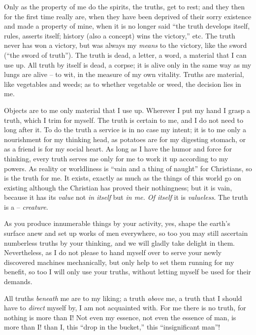 Only as the property of me do the spirits, the truths, get to rest; and they 
then for the first time really are, when they have been deprived of their 
sorry existence and made a property of mine, when it is no longer said ``the 
truth develops itself, rules, asserts itself; history (also a concept) wins 
the victory,'' etc. The truth never has won a victory, but was always my 
\textit{means} to the victory, like the sword (``the sword of truth''). The 
truth is dead, a letter, a word, a material that I can use up. All truth by 
itself is dead, a corpse; it is alive only in the same way as my lungs are 
alive -- to wit, in the measure of my own vitality. Truths are material, like 
vegetables and weeds; as to whether vegetable or weed, the decision lies in 
me.

Objects are to me only material that I use up. Wherever I put my hand I grasp 
a truth, which I trim for myself. The truth is certain to me, and I do not 
need to long after it. To do the truth a service is in no case my intent; it 
is to me only a nourishment for my thinking head, as potatoes are for my 
digesting stomach, or as a friend is for my social heart. As long as I have 
the humor and force for thinking, every truth serves me only for me to work it 
up according to my powers. As reality or worldliness is ``vain and a thing of 
naught'' for Christians, so is the truth for me. It exists, exactly as much 
as the things of this world go on existing although the Christian has proved 
their nothingness; but it is vain, because it has its \textit{value} not 
\textit{in itself} but \textit{in me. Of itself} it is \textit{valueless}. The 
truth is a -- \textit{creature}.

As you produce innumerable things by your activity, yes, shape the earth's 
surface anew and set up works of men everywhere, so too you may still 
ascertain numberless truths by your thinking, and we will gladly take delight 
in them. Nevertheless, as I do not please to hand myself over to serve your 
newly discovered machines mechanically, but only help to set them running for 
my benefit, so too I will only use your truths, without letting myself be used 
for their demands.

All truths \textit{beneath} me are to my liking; a truth \textit{above} me, a 
truth that I should have to \textit{direct} myself by, I am not acquainted 
with. For me there is no truth, for nothing is more than I! Not even my 
essence, not even the essence of man, is more than I! than I, this ``drop in 
the bucket,'' this ``insignificant man''!

